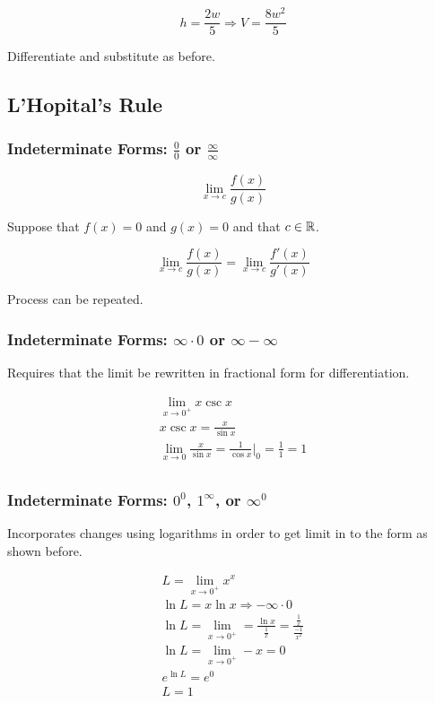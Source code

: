 \[h=\frac{2w}{5} \Rightarrow V=\frac{8w^2}{5}\]

Differentiate and substitute as before.

\subsection{L'Hopital's Rule}\label{subsec:l'hopital's-rule}

\subsubsection{Indeterminate Forms: $\frac{0}{0}$ or $\frac{\infty}{\infty}$}

\[\lim_{x\to{c}}\frac{f(x)}{g(x)}\]

Suppose that $f(x)=0$ and $g(x)=0$ and that $c \in \mathbb{R}$.

\[\lim_{x\to{c}}\frac{f(x)}{g(x)}=\lim_{x\to{c}}\frac{f'(x)}{g'(x)}\]

Process can be repeated.

\subsubsection{Indeterminate Forms: $\infty \cdot 0$ or $\infty - \infty$}

Requires that the limit be rewritten in fractional form for differentiation.

\begin{gather*}
    \lim_{x\to{0^+}}x\csc{x}\\
    x\csc{x}=\frac{x}{\sin{x}}\\
    \lim_{x\to{0}}\frac{x}{\sin{x}}=\frac{1}{\cos{x}}|_{0}=\frac{1}{1}=1\\
\end{gather*}

\subsubsection{Indeterminate Forms: $0^0$, $1^\infty$, or $\infty^0$}

Incorporates changes using logarithms in order to get limit in to the form
as shown before. 

\begin{gather*}
    L=\lim_{x\to{0^+}}x^x\\
    \ln{L}=x\ln{x} \Rightarrow -\infty \cdot 0\\
    \ln{L}=\lim_{x\to{0^+}}=\frac{\ln{x}}{\frac{1}{x}}=\frac{\frac{1}{x}}{\frac{-1}{x^2}}\\
    \ln{L}=\lim_{x\to{0^+}}-x=0\\
    e^{\ln{L}}=e^0\\
    L=1\\
\end{gather*}

